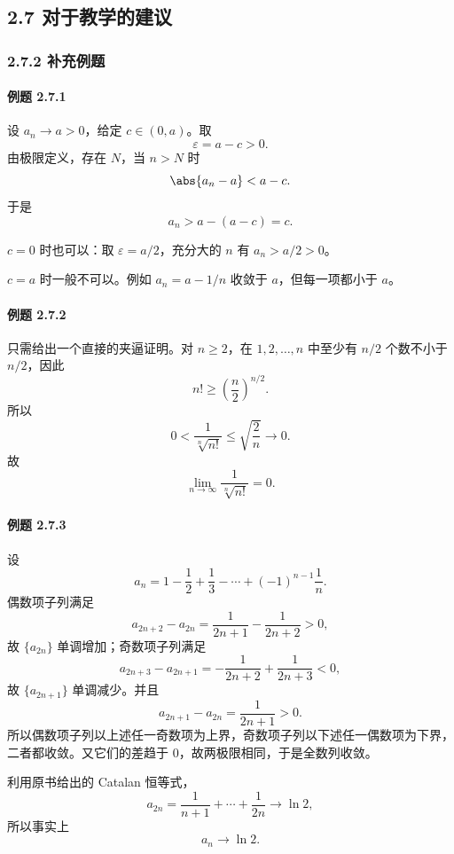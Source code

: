 \subsection*{2.7 对于教学的建议}

\subsubsection*{2.7.2 补充例题}

\paragraph{例题 2.7.1}
\begin{xsolution}
设 $a_n\to a>0$，给定 $c\in(0,a)$。取
\[
  \varepsilon=a-c>0.
\]
由极限定义，存在 $N$，当 $n>N$ 时
\[
  \abs{a_n-a}<a-c.
\]
于是
\[
  a_n>a-(a-c)=c.
\]

$c=0$ 时也可以：取 $\varepsilon=a/2$，充分大的 $n$ 有 $a_n>a/2>0$。

$c=a$ 时一般不可以。例如 $a_n=a-1/n$ 收敛于 $a$，但每一项都小于 $a$。
\end{xsolution}

\paragraph{例题 2.7.2}
\begin{xsolution}
只需给出一个直接的夹逼证明。对 $n\ge2$，在 $1,2,\ldots,n$ 中至少有 $n/2$ 个数不小于 $n/2$，因此
\[
  n!\ge\left(\frac n2\right)^{n/2}.
\]
所以
\[
  0<\frac1{\sqrt[n]{n!}}
  \le\sqrt{\frac2n}\to0.
\]
故
\[
  \boxed{\lim_{n\to\infty}\frac1{\sqrt[n]{n!}}=0}.
\]
\end{xsolution}

\paragraph{例题 2.7.3}
\begin{xsolution}
设
\[
  a_n=1-\frac12+\frac13-\cdots+(-1)^{n-1}\frac1n.
\]
偶数项子列满足
\[
  a_{2n+2}-a_{2n}
  =\frac1{2n+1}-\frac1{2n+2}>0,
\]
故 $\{a_{2n}\}$ 单调增加；奇数项子列满足
\[
  a_{2n+3}-a_{2n+1}
  =-\frac1{2n+2}+\frac1{2n+3}<0,
\]
故 $\{a_{2n+1}\}$ 单调减少。并且
\[
  a_{2n+1}-a_{2n}=\frac1{2n+1}>0.
\]
所以偶数项子列以上述任一奇数项为上界，奇数项子列以下述任一偶数项为下界，二者都收敛。又它们的差趋于 $0$，故两极限相同，于是全数列收敛。

利用原书给出的 Catalan 恒等式，
\[
  a_{2n}=\frac1{n+1}+\cdots+\frac1{2n}\to\ln2,
\]
所以事实上
\[
  \boxed{a_n\to\ln2}.
\]
\end{xsolution}

